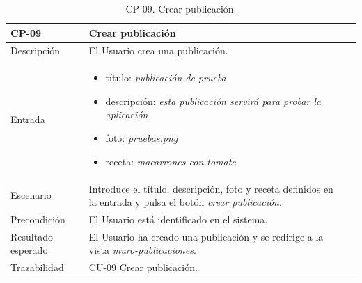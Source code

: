    \begin{table}[H]
        \centering
        \begin{tabularx}{1\textwidth} { 
            | >{\raggedright\arraybackslash}X 
            | >{\raggedright\arraybackslash}X 
            | >{\raggedright\arraybackslash}X 
            |  }
        \hline
        \textbf{CP-09}     & \textbf{Crear publicación}                             \\ \hline
        Descripción        & El Usuario crea una publicación.      \\ \hline
        Entrada            & \begin{itemize}
            \item título: \textit{publicación de prueba}
            \item descripción: \textit{esta publicación servirá para probar la aplicación}
            \item foto: \textit{pruebas.png}
            \item receta: \textit{macarrones con tomate}
        \end{itemize} \\ \hline
        Escenario          & Introduce el título, descripción, foto y receta definidos en la entrada y pulsa el botón \textit{crear publicación}.                            \\ \hline
        Precondición          & El Usuario está identificado en el sistema.                             \\ \hline
        
        Resultado esperado & El Usuario ha creado una publicación y se redirige a la vista \textit{muro-publicaciones}. \\ \hline
        Trazabilidad & CU-09 Crear publicación. \\ \hline
    \end{tabularx}
    \caption{CP-09. Crear publicación.}
    \label{table:CP-09}
        \end{table}


